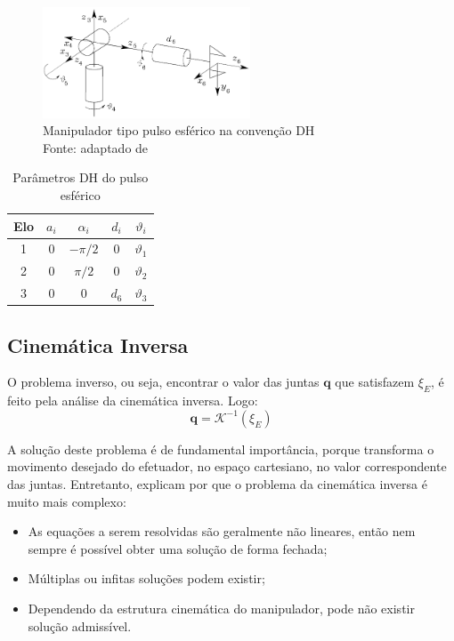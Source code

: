 \begin{figure}[h]
	\centering 
 	\includegraphics[width=0.55\textwidth]{figs/tipica_dh}
 	\caption[Manipulador tipo pulso esférico na convenção DH]
 	{Manipulador tipo pulso esférico na convenção DH \\
 	Fonte: adaptado	de~\cite{sciavicco2012modelling}}
 	\label{fig::tipica_dh}
\end{figure}

%
\begin{table}
\centering
\caption{Parâmetros DH do pulso esférico}
\label{tab::param_dh}
\begin{tabular}{@{}ccccc@{}}
\toprule
Elo & $a_i$ & $\alpha_i$ & $d_i$ & $\vartheta_i$ \\ \midrule
1   & 0     & $-\pi/2$   & 0     & $\vartheta_1$ \\
2   & 0     & $\pi/2$    & 0     & $\vartheta_2$ \\
3   & 0     & 0          & $d_6$ & $\vartheta_3$ \\ \bottomrule
\end{tabular}
\end{table}
%

\subsection{Cinemática Inversa}\label{sec::ikin}

O problema inverso, ou seja, encontrar o valor das juntas $\mathbf{q}$ que
satisfazem $\xi_{E}$, é feito pela análise da cinemática inversa. Logo:
%
\begin{equation} \label{eq::invq}
	\mathbf{q} = \mathcal{K}^{-1}(\xi_{E})
\end{equation}
%

A solução deste problema é de fundamental importância, porque transforma o
movimento desejado do efetuador, no espaço cartesiano, no valor correspondente
das juntas. Entretanto, \citet{sciavicco2012modelling} explicam por que o
problema da cinemática inversa é muito mais complexo:
%
\begin{itemize}
  \item As equações a serem resolvidas são geralmente não lineares, então nem
  sempre é possível obter uma solução de forma fechada;
  \item Múltiplas ou infitas soluções podem existir;
  \item Dependendo da estrutura cinemática do manipulador, pode não existir
  solução admissível.
\end{itemize}
%

